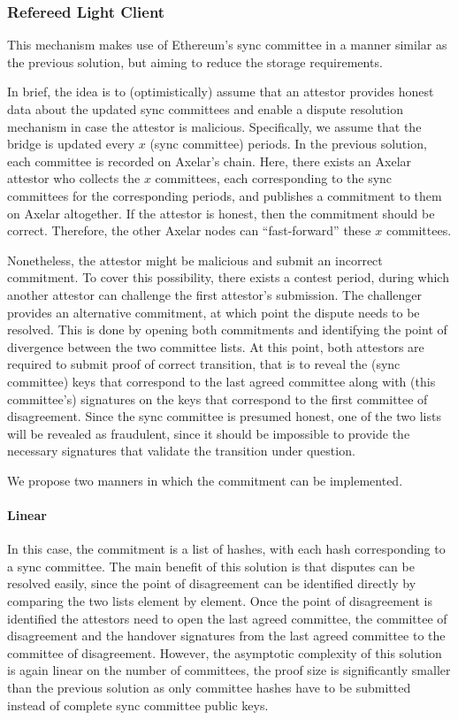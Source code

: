 \subsubsection{Refereed Light Client}

This mechanism makes use of Ethereum's sync committee in a manner similar as
the previous solution, but aiming to reduce the storage requirements.

In brief, the idea is to (optimistically) assume that an attestor provides
honest data about the updated sync committees and enable a dispute resolution
mechanism in case the attestor is malicious\cite{agrawal2023proofs}. Specifically, we assume that the
bridge is updated every $x$ (sync committee) periods. In the previous
solution, each committee is recorded on Axelar's chain. Here, there exists an
Axelar attestor who collects the $x$ committees, each corresponding to the sync
committees for the corresponding periods, and publishes a commitment to them on
Axelar altogether. If the attestor is honest, then the commitment should be
correct.  Therefore, the other Axelar nodes can ``fast-forward'' these $x$
committees.

Nonetheless, the attestor might be malicious and submit an incorrect
commitment. To cover this possibility, there exists a contest period, during
which another attestor can challenge the first attestor's submission. The
challenger provides an alternative commitment, at which point the dispute needs
to be resolved. This is done by opening both commitments and identifying the
point of divergence between the two committee lists. At this point, both
attestors are required to submit proof of correct transition, that is to reveal
the (sync committee) keys that correspond to the last agreed committee along
with (this committee's) signatures on the keys that correspond to the first
committee of disagreement. Since the sync committee is presumed honest, one of
the two lists will be revealed as fraudulent, since it should be impossible to
provide the necessary signatures that validate the transition under question.

We propose two manners in which the commitment can be implemented.

\paragraph{Linear}
In this case, the commitment is a list of hashes, with each hash corresponding
to a sync committee. The main benefit of this solution is that disputes can be
resolved easily, since the point of disagreement can be identified directly by
comparing the two lists element by element. Once the point of disagreement
is identified the attestors need to open the last agreed committee, the committee
of disagreement and the handover signatures from the last agreed committee to the
committee of disagreement.
However, the asymptotic complexity
of this solution is again linear on the number of committees,
the proof size is significantly smaller than the previous solution as only committee hashes
have to be submitted instead of complete sync committee public keys.

